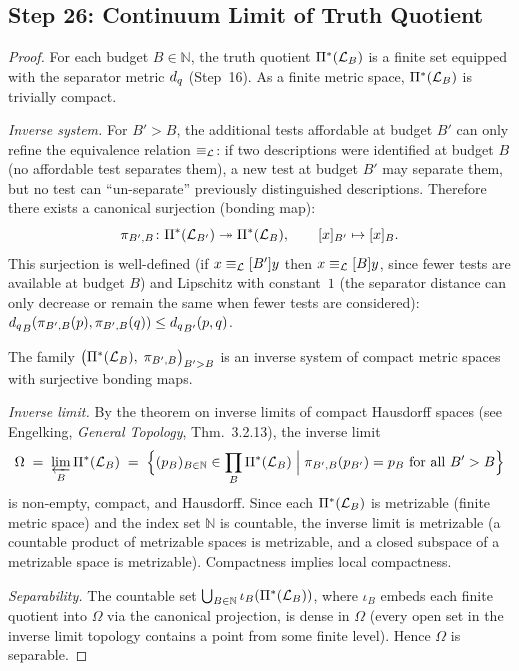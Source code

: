 \subsection{Step 26: Continuum Limit of Truth Quotient}\label{app:step26}

\begin{proof}
For each budget $B \in \mathbb{N}$, the truth quotient $\Pi^*(\mathcal{L}_B)$
is a finite set equipped with the separator metric $d_q$ (Step~16).
As a finite metric space, $\Pi^*(\mathcal{L}_B)$ is trivially compact.

\emph{Inverse system.}  For $B' > B$, the additional tests affordable at
budget $B'$ can only refine the equivalence relation $\equiv_{\mathcal{L}}$: if two
descriptions were identified at budget $B$ (no affordable test separates
them), a new test at budget $B'$ may separate them, but no test can
``un-separate'' previously distinguished descriptions.  Therefore there
exists a canonical surjection (bonding map):
\[
  \pi_{B',B} \colon \Pi^*(\mathcal{L}_{B'}) \twoheadrightarrow \Pi^*(\mathcal{L}_B),
  \qquad [x]_{B'} \mapsto [x]_B.
\]
This surjection is well-defined (if $x \equiv_{\mathcal{L}}[B'] y$ then
$x \equiv_{\mathcal{L}}[B] y$, since fewer tests are available at budget $B$) and
Lipschitz with constant~$1$ (the separator distance can only decrease or
remain the same when fewer tests are considered):
${d_q}_{B}(\pi_{B',B}(p), \pi_{B',B}(q)) \leq {d_q}_{B'}(p, q)$.

The family $\bigl(\Pi^*(\mathcal{L}_B),\; \pi_{B',B}\bigr)_{B' > B}$ is an
inverse system of compact metric spaces with surjective bonding maps.

\emph{Inverse limit.}  By the theorem on inverse limits of compact
Hausdorff spaces (see Engelking, \emph{General Topology}, Thm.~3.2.13),
the inverse limit
\[
  \Omega \;=\; \varprojlim_{B} \Pi^*(\mathcal{L}_B)
  \;=\; \Bigl\{ (p_B)_{B \in \mathbb{N}} \in \prod_B \Pi^*(\mathcal{L}_B)
    \;\Big|\; \pi_{B',B}(p_{B'}) = p_B \text{ for all } B' > B \Bigr\}
\]
is non-empty, compact, and Hausdorff.  Since each $\Pi^*(\mathcal{L}_B)$ is
metrizable (finite metric space) and the index set $\mathbb{N}$ is
countable, the inverse limit is metrizable (a countable product of
metrizable spaces is metrizable, and a closed subspace of a metrizable
space is metrizable).  Compactness implies local compactness.

\emph{Separability.}  The countable set
$\bigcup_{B \in \mathbb{N}} \iota_B(\Pi^*(\mathcal{L}_B))$, where $\iota_B$
embeds each finite quotient into $\Omega$ via the canonical projection,
is dense in $\Omega$ (every open set in the inverse limit topology
contains a point from some finite level).  Hence $\Omega$ is separable.


\end{proof}
